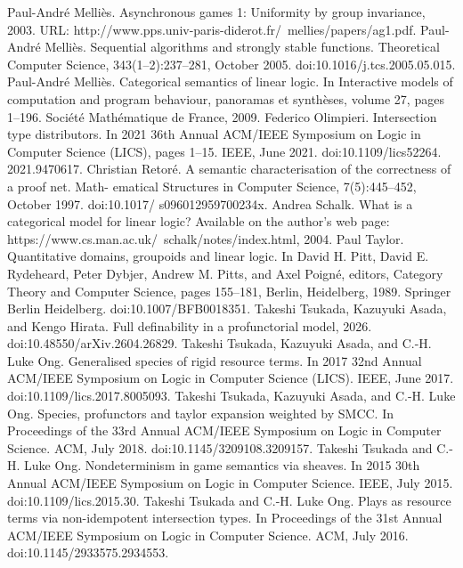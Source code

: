  Paul-André Melliès. Asynchronous games 1: Uniformity by group invariance, 2003. URL:
http://www.pps.univ-paris-diderot.fr/~mellies/papers/ag1.pdf.
 Paul-André Melliès. Sequential algorithms and strongly stable functions. Theoretical Computer
Science, 343(1–2):237–281, October 2005. doi:10.1016/j.tcs.2005.05.015.
 Paul-André Melliès. Categorical semantics of linear logic. In Interactive models of computation
and program behaviour, panoramas et synthèses, volume 27, pages 1–196. Société Mathématique
de France, 2009.
 Federico Olimpieri. Intersection type distributors. In 2021 36th Annual ACM/IEEE Symposium
on Logic in Computer Science (LICS), pages 1–15. IEEE, June 2021. doi:10.1109/lics52264.
2021.9470617.
 Christian Retoré. A semantic characterisation of the correctness of a proof net. Math-
ematical Structures in Computer Science, 7(5):445–452, October 1997. doi:10.1017/
s096012959700234x.
 Andrea Schalk. What is a categorical model for linear logic? Available on the author’s web
page: https://www.cs.man.ac.uk/~schalk/notes/index.html, 2004.
 Paul Taylor. Quantitative domains, groupoids and linear logic. In David H. Pitt, David E.
Rydeheard, Peter Dybjer, Andrew M. Pitts, and Axel Poigné, editors, Category Theory
and Computer Science, pages 155–181, Berlin, Heidelberg, 1989. Springer Berlin Heidelberg.
doi:10.1007/BFB0018351.
 Takeshi Tsukada, Kazuyuki Asada, and Kengo Hirata. Full definability in a profunctorial
model, 2026. doi:10.48550/arXiv.2604.26829.
 Takeshi Tsukada, Kazuyuki Asada, and C.-H. Luke Ong. Generalised species of rigid resource
terms. In 2017 32nd Annual ACM/IEEE Symposium on Logic in Computer Science (LICS).
IEEE, June 2017. doi:10.1109/lics.2017.8005093.
 Takeshi Tsukada, Kazuyuki Asada, and C.-H. Luke Ong. Species, profunctors and taylor
expansion weighted by SMCC. In Proceedings of the 33rd Annual ACM/IEEE Symposium on
Logic in Computer Science. ACM, July 2018. doi:10.1145/3209108.3209157.
 Takeshi Tsukada and C.-H. Luke Ong. Nondeterminism in game semantics via sheaves. In
2015 30th Annual ACM/IEEE Symposium on Logic in Computer Science. IEEE, July 2015.
doi:10.1109/lics.2015.30.
 Takeshi Tsukada and C.-H. Luke Ong. Plays as resource terms via non-idempotent intersection
types. In Proceedings of the 31st Annual ACM/IEEE Symposium on Logic in Computer
Science. ACM, July 2016. doi:10.1145/2933575.2934553.
